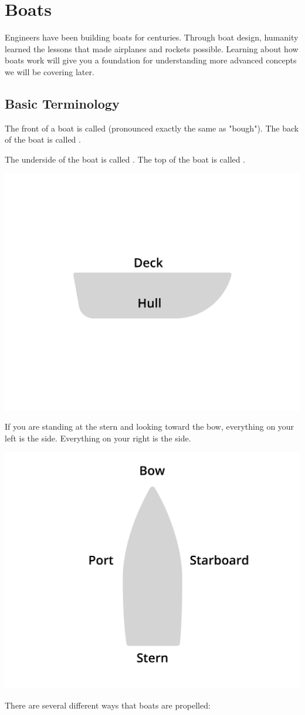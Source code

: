 \chapter{Boats}

Engineers have been building boats for centuries.  Through boat design, humanity learned the lessons that made airplanes and rockets possible.  
Learning about how boats work will give you a foundation for understanding more advanced concepts we will be covering later.

\section{Basic Terminology}

The front of a boat is called  (pronounced exactly the same as "bough"). The back of the boat is called .

The underside of the boat is called .  The top of the boat is called .

\begin{center}
    \includegraphics[width=.75\textwidth]{deckHull.png}
    
\end{center}

If you are standing at the stern and looking toward the bow, everything on your left is the  side.  Everything on your right is the  side.

\begin{center}
    \includegraphics[width=.75\textwidth]{bowStern.png}
    
\end{center}
There are several different ways that boats are propelled:

